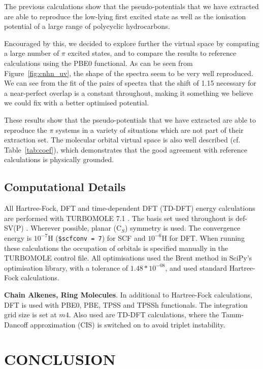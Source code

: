 \documentclass[12pt]{article}
\begin{document}
The previous calculations show that the pseudo-potentials that we have extracted
are able to reproduce the low-lying first excited state as well as the ionisation potential
of a large range of polycyclic hydrocarbons.

Encouraged by this, we decided to explore further the virtual space by computing a large number of $\pi$ excited states, and to compare the results to reference calculations using the PBE0 functional. As can be seen from Figure~\ref{fig:cnhn_uv}, the shape of the spectra seem to be very well reproduced. We can see from the fit of the pairs of spectra that the shift of 1.15 necessary for a near-perfect overlap is a constant throughout, making it something we believe we could fix with a better optimised potential.

These results show that the pseudo-potentials that we have extracted are able to reproduce the
$\pi$ systems in a variety of situations which are not part of their extraction set.
The molecular orbital virtual space is also well described (cf. Table~\ref{tab:coef}),
which demonstrates that the good agreement with reference calculations is
physically grounded.

\clearpage

\subsection*{\sffamily \large Computational Details}

All Hartree-Fock, DFT and time-dependent DFT (TD-DFT) energy calculations are performed with TURBOMOLE 7.1 \cite{TURBOMOLE}. The basis set used throughout is def-SV(P) \cite{defsvp}. Wherever possible, planar (C\(_{S}\)) symmetry is used. The convergence energy is \(10^{-7}\)H (\texttt{\$scfconv = 7}) for SCF and \(10^{-6}\)H for DFT. When running these calculations the occupation of orbitals is specified manually in the TURBOMOLE control file. All optimisations used the Brent method in SciPy's optimisation library, with a tolerance of \(1.48*10^{-08}\), and used standard Hartree-Fock calculations.\cite{scipy}

\textbf{Chain Alkenes, Ring Molecules}. In additional to Hartree-Fock calculations, DFT is used with PBE0, PBE, TPSS and TPSSh functionals. \cite{pbe0,pbe,tpss,tpssh} The integration grid size is set at \(m4\). Also used are TD-DFT calculations, where the Tamm-Dancoff approximation (CIS) \cite{tammdancoff} is switched on to avoid triplet instability.

\section*{\sffamily \Large CONCLUSION}
\end{document}
